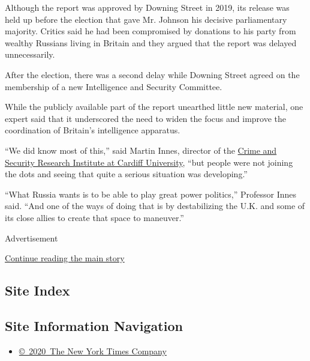 Although the report was approved by Downing Street in 2019, its release
was held up before the election that gave Mr. Johnson his decisive
parliamentary majority. Critics said he had been compromised by
donations to his party from wealthy Russians living in Britain and they
argued that the report was delayed unnecessarily.

After the election, there was a second delay while Downing Street agreed
on the membership of a new Intelligence and Security Committee.

While the publicly available part of the report unearthed little new
material, one expert said that it underscored the need to widen the
focus and improve the coordination of Britain's intelligence apparatus.

``We did know most of this,'' said Martin Innes, director of the
\href{https://www.cardiff.ac.uk/crime-security-research-institute}{Crime
and Security Research Institute at Cardiff University}, ``but people
were not joining the dots and seeing that quite a serious situation was
developing.''

``What Russia wants is to be able to play great power politics,''
Professor Innes said. ``And one of the ways of doing that is by
destabilizing the U.K. and some of its close allies to create that space
to maneuver.''

Advertisement

\protect\hyperlink{after-bottom}{Continue reading the main story}

\hypertarget{site-index}{%
\subsection{Site Index}\label{site-index}}

\hypertarget{site-information-navigation}{%
\subsection{Site Information
Navigation}\label{site-information-navigation}}

\begin{itemize}
\tightlist
\item
  \href{https://help.nytimes.com/hc/en-us/articles/115014792127-Copyright-notice}{©~2020~The
  New York Times Company}
\end{itemize}


